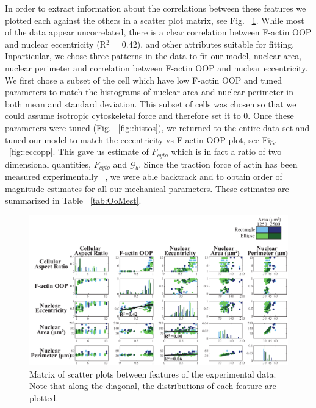 In order to extract information about the correlations between these features we plotted each against the others in a scatter plot matrix, see Fig. ~\ref{fig::scattermatrix}. While most of the data appear uncorrelated, there is a clear correlation between F-actin OOP and nuclear eccentricity (R$^2$ = 0.42), and other attributes suitable for fitting. Inparticular, we chose three patterns in the data to fit our model, nuclear area, nuclear perimeter and correlation between F-actin OOP and nuclear eccentricity. We first chose a subset of the cell which have low F-actin OOP and tuned parameters to match the histograms of nuclear area and nuclear perimeter in both mean and standard deviation. This subset of cells was chosen so that we could assume isotropic cytoskeletal force and therefore set it to 0. Once these parameters were tuned (Fig. ~\ref{fig::histos}), we returned to the entire data set and tuned our model to match the eccentricity vs F-actin OOP plot, see Fig. ~\ref{fig::eccopp}. This gave us estimate of $F_{cyto}$ which is in fact a ratio of two dimensional quantities, $F_{cyto}$ and  $\mathcal{G}_b$. Since the traction force of actin has been measured experimentally ~\cite{Kuo2012}, we were able backtrack and to obtain order of magnitude estimates for all our mechanical parameters. These estimates are summarized in Table ~\ref{tab:OoMest}.

\begin{figure}[h]
\centering
\captionsetup{width=.9\linewidth}
\includegraphics[width=7in]{Project3/figs/Nancy_data.pdf}
\caption{Matrix of scatter plots between features of the experimental data. Note that along the diagonal, the distributions of each feature are plotted. }
\label{fig::scattermatrix}
\end{figure}


